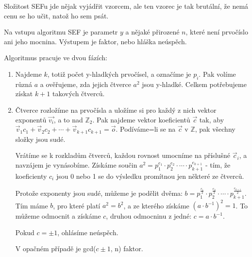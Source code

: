 \documentclass[10pt,a4paper]{article}
\begin{document}
Složitost SEFu jde nějak vyjádřit vzorcem, ale ten vzorec je tak brutální, že
nemá cenu se ho učit, natož ho sem psát.

Na vstupu algoritmu SEF je parametr $y$ a nějaké přirozené $n$, které není
prvočíslo ani jeho mocnina. Výstupem je faktor, nebo hláška neúspěch. 

Algoritmus pracuje ve dvou fázích:

\begin{enumerate}
\item Najdeme $k$, totiž počet y-hladkých prvočísel, a označíme je $p_i$. Pak
volíme různá $a$ a ověřujeme, zda jejich čtverce $a^2$ jsou y-hladké. Celkem
potřebujeme získat $k+1$ takových čtverců.
\item Čtverce rozložíme na prvočísla a uložíme si pro každý z nich vektor
exponentů $\vec{v_i}$, a to nad $\mathbb{Z}_2$. Pak najdeme vektor koeficientů
$\vec{c}$ tak, aby $\vec{v}_1c_1 + \vec{v}_2c_2  + \cdots + \vec{v}_{k+1}c_{k+1}
= \vec{o}$. Podíváme=li se na $\vec{c}$ v  $\mathbb{Z}$, pak všechny složky jsou
sudé. 

Vrátíme se k rozkladům čtverců, každou rovnost umocníme na příslušné
$\vec{c}_i$, a navzájem je vynásobíme. Získáme součin $a^2 = p_1^{e_1} \cdot
p_2^{e_2} \cdot \cdots \cdot p_{k+1}^{e_{k+1}}$ - tím, že koeficienty $c_i$ jsou
0 nebo 1 se do výsledku promítnou jen některé ze čtverců.

Protože exponenty jsou sudé, můžeme je podělit dvěma: $b = p_1^{\frac{e_1}{2}}
\cdot p_2^{\frac{e_2}{2}} \cdot \cdots \cdot p_{k+1}^{\frac{e_{k+1}}{2}}$. Tím
máme $b$, pro které platí $a^2 = b^2$, a ze kterého získáme $(a\cdot b^{-1})^2 =
1$. To můžeme odmocnit a získáme $c$, druhou odmocninu z jedné: $c = a\cdot
b^{-1}$.

Pokud $c = \pm 1$, ohlásíme neúspěch.

V opačném případě je gcd($c \pm 1$, n) faktor.
\end{enumerate}
\end{document}
